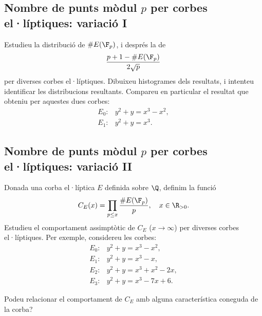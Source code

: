  \subsection{Nombre de punts mòdul \texorpdfstring{$p$}{p} per corbes el·líptiques: variació I}
 Estudieu la distribució de $\#E(\F_p)$, i després la de
 \[
 \frac{p+1 - \#E(\F_p)}{2\sqrt{p}}
 \]
 per diverses corbes el·líptiques. Dibuixeu histogrames dels resultats, i intenteu identificar les distribucions resultants. Compareu en particular el resultat que obteniu per aquestes dues corbes:
 \begin{align*}
     E_0\colon & y^2 + y = x^3 - x^2,\\
     E_1\colon & y^2 + y = x^3.
 \end{align*}

 \subsection{Nombre de punts mòdul \texorpdfstring{$p$}{p} per corbes el·líptiques: variació II}
 Donada una corba el·líptica $E$ definida sobre $\Q$, definim la funció
 \[
 C_E(x) = \prod_{p\leq x}\frac{\#E(\F_p)}{p},\quad x\in\R_{>0}.
 \]
 Estudieu el comportament assimptòtic de $C_E$ ($x\to\infty$) per diverses corbes el·líptiques. Per exemple, considereu les corbes:
 \begin{align*}
E_0\colon& y^2+y=x^3-x^2,\\
E_1\colon& y^2+y=x^3-x,\\
E_2\colon& y^2+y = x^3+x^2-2x,\\
E_3\colon&y^2 +y =x^3 - 7x+6.
 \end{align*}

 Podeu relacionar el comportament de $C_E$ amb alguna característica coneguda de la corba?
